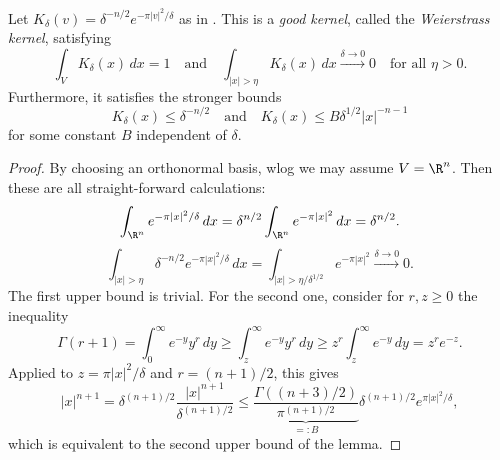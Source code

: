 \begin{lemma}
\label{lem:weierstrass-kernel}
\leanok
Let $K_\delta(v)=\delta^{-n/2}e^{-\pi|v|^2/\delta}$
as in . This is a
\emph{good kernel}, called the \emph{Weierstrass kernel}, satisfying
$$\int_{V}K_\delta(x)\,dx= 1\quad\text{and}\quad
\int_{|x|>\eta}K_\delta(x)\,dx\xrightarrow{\delta\to0}0\quad\text{for all }\eta>0.$$
Furthermore, it satisfies the stronger bounds
$$K_\delta(x)\leq \delta^{-n/2}\quad\text{and}\quad K_\delta(x)\leq B\delta^{1/2}|x|^{-n-1}$$ for
some constant $B$ independent of $\delta$.
\end{lemma}
\begin{proof}
  \leanok
  By choosing an orthonormal basis, wlog we may assume $V=\R^n$. Then these are all straight-forward calculations:
  $$\int_{\R^n}e^{-\pi|x|^2/\delta}\,dx=\delta^{n/2}\int_{\R^n}e^{-\pi|x|^2}\,dx=\delta^{n/2}.$$
  $$\int_{|x|>\eta}\delta^{-n/2}e^{-\pi|x|^2/\delta}\,dx=\int_{|x|>\eta/\delta^{1/2}}e^{-\pi|x|^2}\xrightarrow{\delta\to0}0.$$
  The first upper bound is trivial. For the second one, consider for $r,z\geq0$ the inequality
  $$\Gamma(r+1)=\int_0^\infty e^{-y}y^r\,dy\geq\int_z^\infty e^{-y}y^r\,dy\geq z^r\int_z^\infty e^{-y}\,dy=z^re^{-z}.$$
  Applied to $z=\pi|x|^2/\delta$ and $r=(n+1)/2$, this gives
  $$|x|^{n+1}=\delta^{(n+1)/2}\frac{|x|^{n+1}}{\delta^{(n+1)/2}}\leq
  \underbrace{\frac{\Gamma((n+3)/2)}{\pi^{(n+1)/2}}}_{=:B}\delta^{(n+1)/2}e^{\pi|x|^2/\delta},$$
  which is equivalent to the second upper bound of the lemma.
\end{proof}

